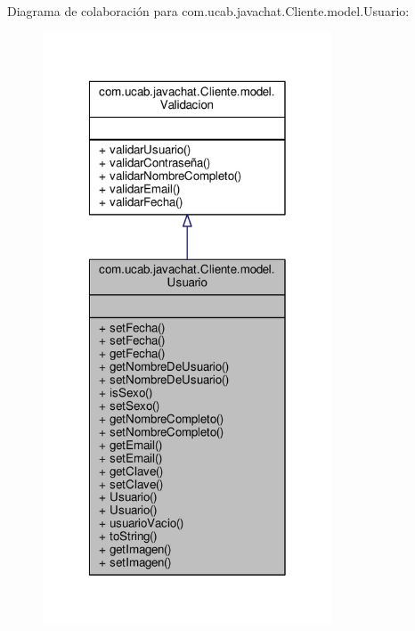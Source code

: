 Diagrama de colaboración para com.\-ucab.\-javachat.\-Cliente.\-model.\-Usuario\-:
\nopagebreak
\begin{figure}[H]
\begin{center}
\leavevmode
\includegraphics[width=244pt]{da/d6d/classcom_1_1ucab_1_1javachat_1_1_cliente_1_1model_1_1_usuario__coll__graph}
\end{center}
\end{figure}
